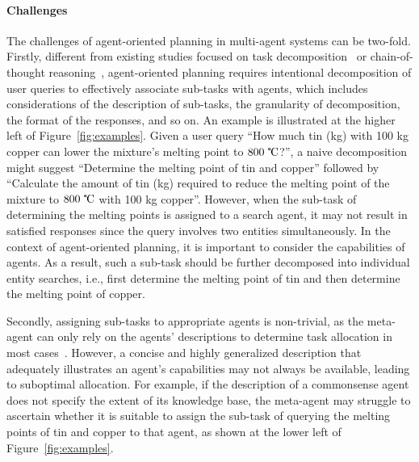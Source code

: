 \paragraph{Challenges}
The challenges of agent-oriented planning in multi-agent systems can be two-fold. Firstly, different from existing studies focused on task decomposition~\citep{shen2024hugginggpt, lu2024chameleon} or chain-of-thought reasoning~\citep{wei2022chain}, agent-oriented planning requires intentional decomposition of user queries to effectively associate sub-tasks with agents, which includes considerations of the description of sub-tasks, the granularity of decomposition, the format of the responses, and so on. An example is illustrated at the higher left of Figure~\ref{fig:examples}. 
Given a user query ``How much tin (kg) with 100 kg copper can lower the mixture's melting point to $800\ \tccentigrade$?'', a naive decomposition might suggest ``Determine the melting point of tin and copper'' followed by ``Calculate the amount of tin (kg) required to reduce the melting point of the mixture to $800\ \tccentigrade$ with 100 kg copper''. However, when the sub-task of determining the melting points is assigned to a search agent, it may not result in satisfied responses since the query involves two entities simultaneously. In the context of agent-oriented planning, it is important to consider the capabilities of agents. As a result, such a sub-task should be further decomposed into individual entity searches, i.e., first determine the melting point of tin and then determine the melting point of copper.


Secondly, assigning sub-tasks to appropriate agents is non-trivial, as the meta-agent can only rely on the agents' descriptions to determine task allocation in most cases~\citep{shen2024hugginggpt}. However, a concise and highly generalized description that adequately illustrates an agent's capabilities may not always be available, leading to suboptimal allocation.
For example, if the description of a commonsense agent does not specify the extent of its knowledge base, the meta-agent may struggle to ascertain whether it is suitable to assign the sub-task of querying the melting points of tin and copper to that agent, as shown at the lower left of Figure~\ref{fig:examples}.

